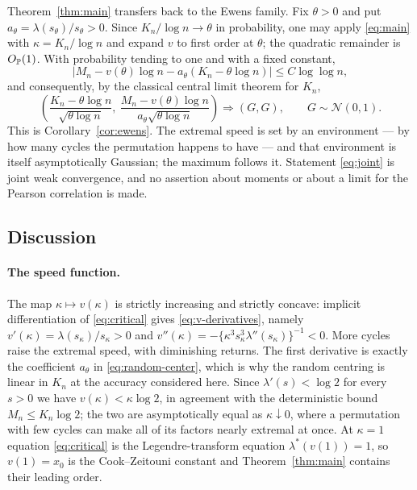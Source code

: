 \documentclass[11pt]{article}
\theoremstyle{definition}\newtheorem{definition}[theorem]{Definition}
\theoremstyle{remark}\newtheorem{remark}[theorem]{Remark}
\newcommand{\Op}{O_{\Pp}}\newcommand{\eps}{\varepsilon}
\numberwithin{equation}{section}\allowdisplaybreaks
\begin{document}
Theorem~\ref{thm:main} transfers back to the Ewens family. Fix
$\theta>0$ and put $a_\theta=\lambda(s_\theta)/s_\theta>0$. Since
$K_n/\log n\to\theta$ in probability, one may apply \eqref{eq:main} with
$\kappa=K_n/\log n$ and expand $v$ to first order at $\theta$; the
quadratic remainder is $\Op(1)$. With probability tending to one and
with a fixed constant,
\begin{equation}\label{eq:random-center}
 \bigl|M_n-v(\theta)\log n-a_\theta(K_n-\theta\log n)\bigr|
   \le C\log\log n,
\end{equation}
and consequently, by the classical central limit theorem for $K_n$,
\begin{equation}\label{eq:joint}
 \left(\frac{K_n-\theta\log n}{\sqrt{\theta\log n}},\
       \frac{M_n-v(\theta)\log n}{a_\theta\sqrt{\theta\log n}}\right)
 \Longrightarrow(G,G),\qquad G\sim\mathcal N(0,1).
\end{equation}
This is Corollary~\ref{cor:ewens}. The extremal speed is set by an
environment --- by how many cycles the permutation happens to have ---
and that environment is itself asymptotically Gaussian; the maximum
follows it. Statement \eqref{eq:joint} is joint weak convergence, and no
assertion about moments or about a limit for the Pearson correlation is
made.

\subsection{Discussion}\label{subsec:discussion}

\paragraph{The speed function.} The map $\kappa\mapsto v(\kappa)$ is
strictly increasing and strictly concave: implicit differentiation of
\eqref{eq:critical} gives \eqref{eq:v-derivatives}, namely
$v'(\kappa)=\lambda(s_\kappa)/s_\kappa>0$ and
$v''(\kappa)=-\{\kappa^3s_\kappa^3\lambda''(s_\kappa)\}^{-1}<0$. More
cycles raise the extremal speed, with diminishing returns. The first
derivative is exactly the coefficient $a_\theta$ in
\eqref{eq:random-center}, which is why the random centring is linear in
$K_n$ at the accuracy considered here. Since $\lambda'(s)<\log2$ for
every $s>0$ we have $v(\kappa)<\kappa\log2$, in agreement with the
deterministic bound $M_n\le K_n\log2$; the two are asymptotically equal
as $\kappa\downarrow0$, where a permutation with few cycles can make all
of its factors nearly extremal at once. At $\kappa=1$ equation
\eqref{eq:critical} is the Legendre-transform equation
$\lambda^*(v(1))=1$, so $v(1)=x_0$ is the Cook--Zeitouni constant and
Theorem~\ref{thm:main} contains their leading order.
\end{document}
